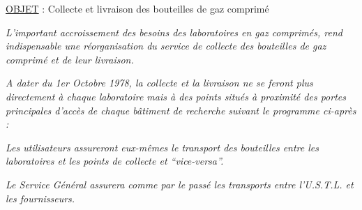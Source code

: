 \uline{OBJET} : Collecte et livraison des bouteilles de gaz comprimé

\textit{L'important accroissement des besoins des laboratoires en gaz comprimés, rend indispensable une réorganisation du service de collecte des bouteilles de gaz comprimé et de leur livraison.}

\textit{A dater du 1er Octobre 1978, la collecte et la livraison ne se feront plus directement à chaque laboratoire mais à des points situés à proximité des portes principales d'accès de chaque bâtiment de recherche suivant le programme ci-après :}


\textit{Les utilisateurs assureront eux-mêmes le transport des bouteilles entre les laboratoires et les points de collecte et ``vice-versa''.}

\textit{Le Service Général assurera comme par le passé les transports entre l'U.S.T.L. et les fournisseurs.}


